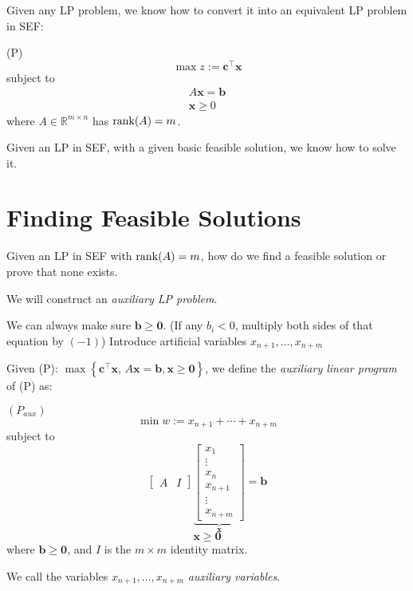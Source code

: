 Given any LP problem, we know how to convert it into an equivalent LP
problem in SEF\@:

(P)
\[\max z:=\bm{c}^\top \bm{x}\]
subject to
\begin{align*}
    A \bm{x}=\bm{b} \\
    \bm{x}\geqslant  0
\end{align*}
where $ A\in\mathbb{R}^{m\times n}$ has $\operatorname{rank}(A)=m $.

Given an LP in SEF, with a given basic feasible solution, we know
how to solve it.

\section{Finding Feasible Solutions}
Given an LP in SEF with $ \operatorname{rank}(A)=m $, how do we find a feasible
solution or prove that none exists.

We will construct an \emph{auxiliary LP problem}.

We can always make sure $ \bm{b}\geqslant  \bm{0} $. (If any $ b_i<0 $, multiply both
sides of that equation by $ (-1) $) Introduce artificial variables
$ x_{n+1},\ldots,x_{n+m} $

\begin{defbox}
    \begin{definition}
        Given (P): $\max \left\{ \bm{c}^\top \bm{x},\,A \bm{x}=\bm{b},\bm{x}\geqslant  \bm{0} \right\}$,
        we define the \emph{auxiliary linear program} of (P) as:

        $ (P_{aux}) $
        \[ \min w:=x_{n+1}+\cdots+x_{n+m} \]
        subject to
        \[
            \left[\begin{array}{c|c}
                    A & I
                \end{array}\right]
            \underbrace{\begin{bmatrix}
                    x_1     \\
                    \vdots  \\
                    x_{n}   \\
                    x_{n+1} \\
                    \vdots  \\
                    x_{n+m}
                \end{bmatrix}}_{\bm{x}}
            =\bm{b}\]
        \[ \bm{x} \geqslant  \bm{0}\]
        where $ \bm{b}\geqslant  \bm{0} $, and $ I $ is the $ m\times m $ identity matrix.

        We call the variables $ x_{n+1},\ldots,x_{n+m} $ \emph{auxiliary variables}.
    \end{definition}
\end{defbox}


